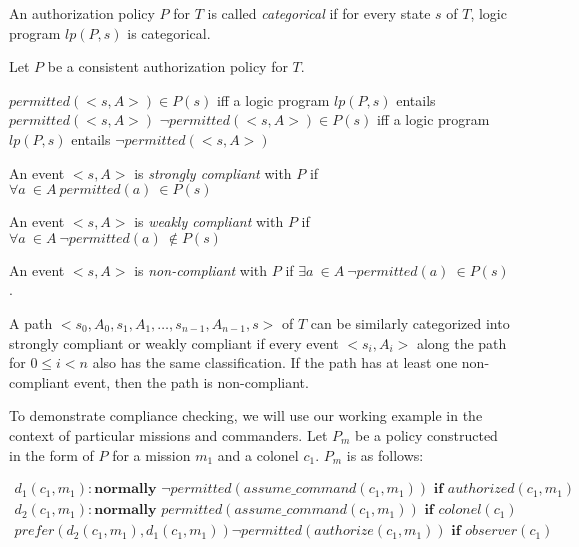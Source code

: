 \begin{definition}
    An authorization policy $P$ for $T$ is called \textit{categorical} if for every state $s$ of $T$, logic program $lp(P, s)$ is categorical.
\end{definition}

\begin{lemma}
    Let $P$ be a consistent authorization policy for $T$.

    $permitted(<s, A>) \in P(s)$ iff a logic program $lp(P, s)$ entails $permitted(<s,A>)$
    $\neg permitted(<s,A>) \in P(s)$ iff a logic program $lp(P, s)$ entails $\neg permitted(<s, A>)$
\end{lemma}

\begin{definition}
    An event $<s, A>$ is \textit{strongly compliant} with $P$ if $\forall a\ \in A\ permitted(a)\ \in P(s)$

    An event $<s, A>$ is \textit{weakly compliant} with $P$ if $\forall a\ \in A\ \neg permitted(a)\ \not \in P(s)$

    An event $<s, A>$ is \textit{non-compliant} with $P$ if $\exists a\ \in A\ \neg permitted(a)\ \in P(s)$.
\end{definition}

A path $<s_0, A_0, s_1, A_1, \dots, s_{n-1}, A_{n-1}, s>$ of $T$ can be similarly categorized into strongly compliant or weakly compliant if every event $<s_i, A_i>$ along the path for $0 \le i < n$ also has the same classification.
If the path has at least one non-compliant event, then the path is non-compliant.

To demonstrate compliance checking, we will use our working example in the context of particular missions and commanders.
Let $P_m$ be a policy constructed in the form of $P$ for a mission $m_1$ and a colonel $c_1$. $P_m$ is as follows:

\begin{gather*}
    d_1(c_1, m_1): \textbf{normally } \neg permitted(assume\_command(c_1, m_1)) \textbf{ if } authorized(c_1, m_1) \\
    d_2(c_1, m_1): \textbf{normally } permitted(assume\_command(c_1, m_1)) \textbf{ if } colonel(c_1) \\
    prefer(d_2(c_1,m_1),d_1(c_1,m_1))
    \neg permitted(authorize(c_1, m_1)) \textbf{ if } observer(c_1)
\end{gather*}
